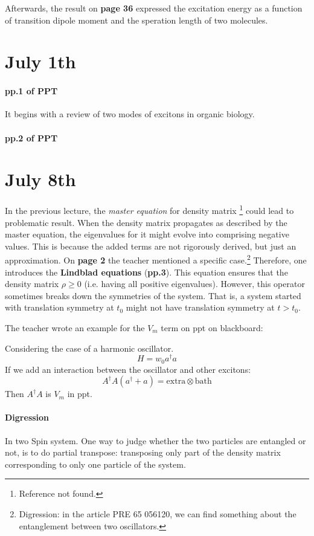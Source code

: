 \documentclass{article}
\numberwithin{equation}{subsection} %
\theoremstyle{definition}
\begin{document}
Afterwards, the result on \textbf{page 36} expressed the excitation energy 
as a function of
transition dipole moment and the speration length of two molecules.

\section{July 1th}
\label{sec:July_1th}
\paragraph{pp.1 of PPT} It begins with a review of two modes of excitons
in organic biology.
\paragraph{pp.2 of PPT}
\section{July 8th}
\label{sec:July_8th}
In the previous lecture, the \textit{master equation} for density matrix
\footnote{Reference not found.}
could lead to problematic result. When the density matrix propagates
as described by the master equation, the eigenvalues for it might
evolve into comprising negative values. This is because the added terms
are not rigorously derived, but just an approximation. On \textbf{page 2} the
teacher mentioned a specific case.\footnote{
    Digression: in the article PRE 65 056120, we can find
    something about the entanglement between two oscillators.
}
Therefore, one introduces the \textbf{Lindblad equations}
(\textbf{pp.3}). This equation ensures that the 
density matrix $\rho \geq 0$ (i.e. having all positive
eigenvalues). However, this operator sometimes breaks down
the symmetries of the system. That is, a system started with
translation symmetry at $t_0$ might not have translation
symmetry at $t > t_0$.

The teacher wrote an example for the $V_m$ term on ppt on blackboard:

Considering the case of a harmonic oscillator.
$$ H = w_0 a^\dagger a $$
If we add an interaction between the oscillator and other excitons:
$$ A^\dagger A (a^\dagger + a) = \text{extra} \otimes \text{bath}$$
Then $A^\dagger A$ is $V_m$ in ppt.


\paragraph{Digression} In two Spin system. One way to judge
whether the two particles are entangled or not, is to do partial
transpose: transposing only part of the density
matrix corresponding to only one particle of the system.
\end{document}
